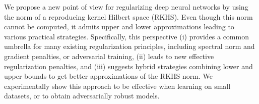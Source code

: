 We propose a new point of view for regularizing deep neural networks by using 
the norm of a reproducing kernel Hilbert space (RKHS). Even though this norm cannot be computed,
it admits upper and lower approximations leading to various practical strategies. 
Specifically, this perspective (i) provides a common umbrella for many existing regularization principles, including spectral norm and gradient penalties,
or adversarial training, (ii) leads to new effective regularization penalties, and
(iii) suggests hybrid strategies combining lower and upper bounds to get better approximations of the RKHS norm.
We experimentally show this approach
to be effective when learning on small datasets, or to obtain
adversarially robust models.
